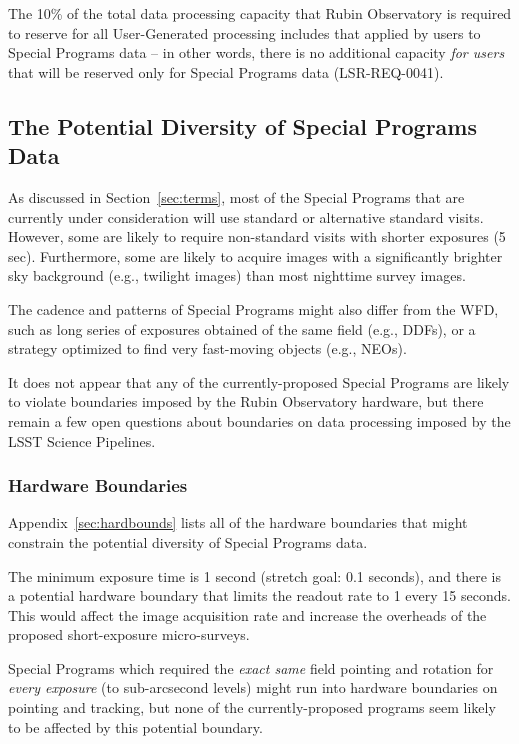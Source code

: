 \documentclass[DM,lsstdoc,toc]{lsstdoc}
\begin{document}
The 10\% of the total data processing capacity that Rubin Observatory is required to reserve for all User-Generated processing includes that applied by users to Special Programs data -- in other words, there is no additional capacity {\it for users} that will be reserved only for Special Programs data (LSR-REQ-0041).



\subsection{The Potential Diversity of Special Programs Data} \label{ssec:proc_datadiv}

As discussed in Section~\ref{sec:terms}, most of the Special Programs that are currently under consideration will use standard or alternative standard visits.
However, some are likely to require non-standard visits with shorter exposures (5 sec).
Furthermore, some are likely to acquire images with a significantly brighter sky background (e.g., twilight images) than most nighttime survey images.

The cadence and patterns of Special Programs might also differ from the WFD, such as long series of exposures obtained of the same field (e.g., DDFs), or a strategy optimized to find very fast-moving objects (e.g., NEOs).

It does not appear that any of the currently-proposed Special Programs are likely to violate boundaries imposed by the Rubin Observatory hardware, but there remain a few open questions about boundaries on data processing imposed by the LSST Science Pipelines.

\subsubsection{Hardware Boundaries}

Appendix~\ref{sec:hardbounds} lists all of the hardware boundaries that might constrain the potential diversity of Special Programs data.

The minimum exposure time is 1 second (stretch goal: 0.1 seconds), and there is a potential hardware boundary that limits the readout rate to 1 every 15 seconds.
This would affect the image acquisition rate and increase the overheads of the proposed short-exposure micro-surveys.

Special Programs which required the \emph{exact same} field pointing and rotation for \emph{every exposure} (to sub-arcsecond levels) might run into hardware boundaries on pointing and tracking, but none of the currently-proposed programs seem likely to be affected by this potential boundary. 
\end{document}
